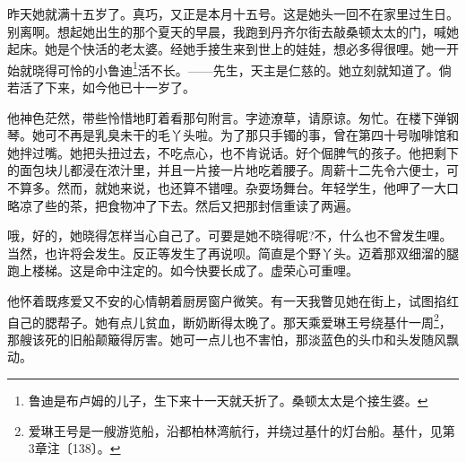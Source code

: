 \par 昨天她就满十五岁了。真巧，又正是本月十五号。这是她头一回不在家里过生日。别离啊。想起她出生的那个夏天的早晨，我跑到丹齐尔街去敲桑顿太太的门，喊她起床。她是个快活的老太婆。经她手接生来到世上的娃娃，想必多得很哩。她一开始就晓得可怜的小鲁迪\footnote{鲁迪是布卢姆的儿子，生下来十一天就夭折了。桑顿太太是个接生婆。}活不长。——先生，天主是仁慈的。她立刻就知道了。倘若活了下来，如今他已十一岁了。
\par 他神色茫然，带些怜惜地盯着看那句附言。字迹潦草，请原谅。匆忙。在楼下弹钢琴。她可不再是乳臭未干的毛丫头啦。为了那只手镯的事，曾在第四十号咖啡馆和她拌过嘴。她把头扭过去，不吃点心，也不肯说话。好个倔脾气的孩子。他把剩下的面包块儿都浸在浓汁里，并且一片接一片地吃着腰子。周薪十二先令六便士，可不算多。然而，就她来说，也还算不错哩。杂耍场舞台。年轻学生，他呷了一大口略凉了些的茶，把食物冲了下去。然后又把那封信重读了两遍。
\par 哦，好的，她晓得怎样当心自己了。可要是她不晓得呢?不，什么也不曾发生哩。当然，也许将会发生。反正等发生了再说呗。简直是个野丫头。迈着那双细溜的腿跑上楼梯。这是命中注定的。如今快要长成了。虚荣心可重哩。
\par 他怀着既疼爱又不安的心情朝着厨房窗户微笑。有一天我瞥见她在街上，试图掐红自己的腮帮子。她有点儿贫血，断奶断得太晚了。那天乘爱琳王号绕基什一周\footnote{爱琳王号是一艘游览船，沿都柏林湾航行，并绕过基什的灯台船。基什，见第3章注〔138〕。}，那艘该死的旧船颠簸得厉害。她可一点儿也不害怕，那淡蓝色的头巾和头发随风飘动。
